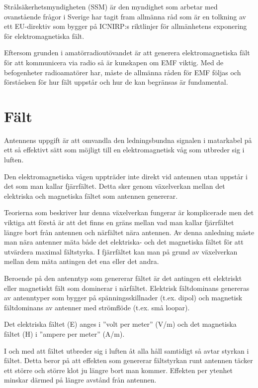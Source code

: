 Strålsäkerhetsmyndigheten (SSM) är den myndighet som arbetar med
ovanstående frågor i Sverige har tagit fram allmänna råd som är
en tolkning av ett EU-direktiv som bygger på ICNIRP:s riktlinjer för
allmänhetens exponering för elektromagnetiska fält.

Eftersom grunden i amatörradioutövandet är att generera elektromagnetiska fält
för att kommunicera via radio så är kunskapen om EMF viktig.
Med de befogenheter radioamatörer har, måste de allmänna råden för EMF följas
och förståelsen för hur fält uppstår och hur de kan begränsas är fundamental.

\section{Fält}
Antennens uppgift är att omvandla den ledningsbundna signalen i matarkabel på
ett så effektivt sätt som möjligt till en elektromagnetisk våg som utbreder sig
i luften.

Den elektromagnetiska vågen uppträder inte direkt vid antennen utan
uppstår i det som man kallar fjärrfältet.
Detta sker genom växelverkan mellan det elektriska och magnetiska fältet som
antennen genererar.

Teorierna som beskriver hur denna växelverkan fungerar är komplicerade
men det viktiga att förstå är att det finns en gräns mellan vad man
kallar fjärrfältet längre bort från antennen och närfältet nära antennen.
Av denna anledning måste man nära antenner mäta både det elektriska- och det
magnetiska fältet för att utvärdera maximal fältstyrka.
I fjärrfältet kan man på grund av växelverkan mellan dem mäta antingen det ena
eller det andra.

Beroende på den antenntyp som genererar fältet är det antingen ett elektriskt
eller magnetiskt fält som dominerar i närfältet.
Elektrisk fältdominans genereras av antenntyper som bygger på
spänningsskillnader (t.ex. dipol) och magnetisk fältdominans av antenner
med strömflöde (t.ex. små loopar).

Det elektriska fältet (E) anges i ''volt per meter'' (V/m) och det
magnetiska fältet (H) i ''ampere per meter'' (A/m).

I och med att fältet utbreder sig i luften åt alla håll samtidigt så avtar
styrkan i fältet.
Detta beror på att effekten som genererar fältstyrkan runt antennen täcker ett
större och större klot ju längre bort man kommer.
Effekten per ytenhet minskar därmed på längre avstånd från antennen.

